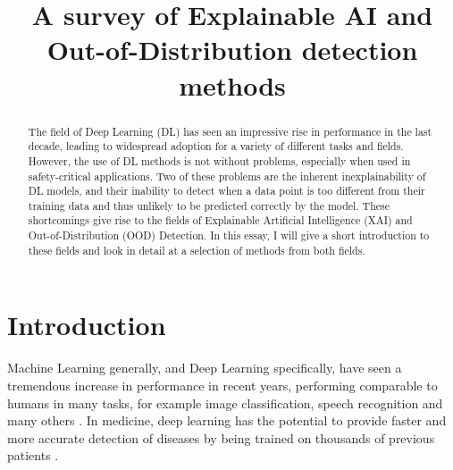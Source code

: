 \documentclass[conference,onecolumn]{IEEEtran}
\begin{document}
\title{A survey of Explainable AI and Out-of-Distribution detection methods}
\thispagestyle{plain}
\pagestyle{plain}

\author{
}

\maketitle




\begin{abstract}


The field of Deep Learning (DL) has seen an impressive rise in performance in the last decade, leading to widespread adoption for a variety of different tasks and fields. However, the use of DL methods is not without problems, especially when used in safety-critical applications. Two of these problems are the inherent inexplainability of DL models, and their inability to detect when a data point is too different from their training data and thus unlikely to be predicted correctly by the model. These shortcomings give rise to the fields of Explainable Artificial Intelligence (XAI) and Out-of-Distribution (OOD) Detection. In this essay, I will give a short introduction to these fields and look in detail at a selection of methods from both fields.

\end{abstract}

\section{Introduction}

Machine Learning generally, and Deep Learning specifically, have seen a tremendous increase in performance in recent years, performing comparable to humans in many tasks, for example image classification, speech recognition and many others \cite{performance}. In medicine, deep learning has the potential to provide faster and more accurate detection of diseases by being trained on thousands of previous patients \cite{xaisurvey}.
\end{document}
